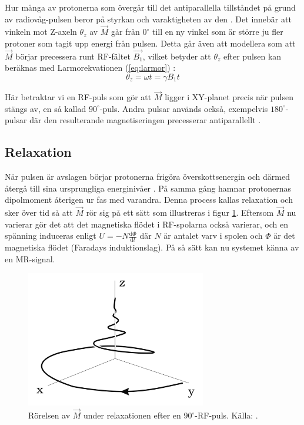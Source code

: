 \documentclass[11pt, a4paper]{article}
\begin{document}
Hur många av protonerna som övergår till det antiparallella tillståndet på grund av radiovåg-pulsen beror på styrkan och varaktigheten av den \parencite{mri_for_radiologists}. Det innebär att vinkeln mot Z-axeln $\theta_z$ av $\vec{M}$ går från $0^\circ$ till en ny vinkel som är större ju fler protoner som tagit upp energi från pulsen. Detta går även att modellera som att $\vec{M}$ börjar precessera runt RF-fältet $\vec{B_1}$, vilket betyder att $\theta_z$ efter pulsen kan beräknas med Larmorekvationen (\ref{eq:larmor}) \parencite[s. 45]{mri_lärobok}:
\begin{equation}
	\theta_z=\omega t=\gamma B_1t
\end{equation}

Här betraktar vi en RF-puls som gör att $\vec{M}$ ligger i XY-planet precis när pulsen stängs av, en så kallad $90^\circ$-puls. Andra pulsar används också, exempelvis $180^\circ$-pulsar där den resulterande magnetiseringen precesserar antiparallellt \parencite{mri_for_radiologists}.

\subsection{Relaxation}
När pulsen är avslagen börjar protonerna frigöra överskottsenergin och därmed återgå till sina ursprungliga energinivåer \parencite{understanding_mri}. På samma gång hamnar protonernas dipolmoment återigen ur fas med varandra. Denna process kallas relaxation och sker över tid så att $\vec{M}$ rör sig på ett sätt som illustreras i figur \ref{fig:relaxation}. Eftersom $\vec{M}$ nu varierar gör det att det magnetiska flödet i RF-spolarna också varierar, och en spänning induceras enligt $U=-N\frac{\mathrm{d}\Phi}{\mathrm{d}t}$ där $N$ är antalet varv i spolen och $\Phi$ är det magnetiska flödet (Faradays induktionslag). På så sätt kan nu systemet känna av en MR-signal.

\begin{figure}[ht]
	\centering
	\includegraphics[width=0.7\textwidth]{relaxation}
	\caption{Rörelsen av $\vec{M}$ under relaxationen efter en $90^\circ$-RF-puls. Källa: \cite{mri_lärobok}.}
	\label{fig:relaxation}
\end{figure}
\end{document}
